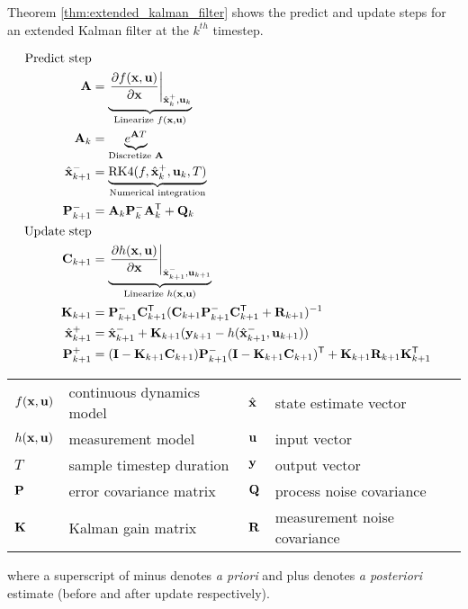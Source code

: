 Theorem \ref{thm:extended_kalman_filter} shows the predict and update steps for
an extended Kalman filter at the $k^{th}$ timestep.
\begin{theorem}
  \label{thm:extended_kalman_filter}
  \begin{align}
    \text{Predict step} \nonumber \\
    \mathbf{A} &=
      \underbrace{\left.\frac{\partial f(\mathbf{x}, \mathbf{u})}{\partial \mathbf{x}}
                  \right|_{\hat{\mathbf{x}}_k^+, \mathbf{u}_k}}
                 _{\text{Linearize } f(\mathbf{x}, \mathbf{u})} \\
    \mathbf{A}_k &= \underbrace{e^{\mathbf{A}T}}_{\text{Discretize } \mathbf{A}} \\
    \hat{\mathbf{x}}_{k+1}^- &=
      \underbrace{\text{RK4}(f, \hat{\mathbf{x}}_k^+, \mathbf{u}_k, T)}
                 _{\text{Numerical integration}} \\
    \mathbf{P}_{k+1}^- &= \mathbf{A}_k \mathbf{P}_k^- \mathbf{A}_k^\mathsf{T} + \mathbf{Q}_k \\
    \text{Update step} \nonumber \\
    \mathbf{C}_{k+1} &=
      \underbrace{\left.\frac{\partial h(\mathbf{x}, \mathbf{u})}{\partial \mathbf{x}}
                  \right|_{\hat{\mathbf{x}}_{k+1}^-, \mathbf{u}_{k+1}}}
                 _{\text{Linearize } h(\mathbf{x}, \mathbf{u})} \\
    \mathbf{K}_{k+1} &= \mathbf{P}_{k+1}^- \mathbf{C}_{k+1}^\mathsf{T}
      (\mathbf{C}_{k+1}\mathbf{P}_{k+1}^- \mathbf{C}_{k+1}^\mathsf{T} + \mathbf{R}_{k+1})^{-1} \\
    \hat{\mathbf{x}}_{k+1}^+ &=
      \hat{\mathbf{x}}_{k+1}^- + \mathbf{K}_{k+1}(\mathbf{y}_{k+1} -
      h(\hat{\mathbf{x}}_{k+1}^-, \mathbf{u}_{k+1})) \\
    \mathbf{P}_{k+1}^+ &= (\mathbf{I} - \mathbf{K}_{k+1}\mathbf{C}_{k+1})\mathbf{P}_{k+1}^-
      (\mathbf{I} - \mathbf{K}_{k+1}\mathbf{C}_{k+1})^\mathsf{T} +
      \mathbf{K}_{k+1}\mathbf{R}_{k+1}\mathbf{K}_{k+1}^\mathsf{T}
  \end{align}
  \begin{figurekey}
    \begin{tabular}{llll}
      $f(\mathbf{x}, \mathbf{u})$ & continuous dynamics model & $\hat{\mathbf{x}}$ & state estimate vector \\
      $h(\mathbf{x}, \mathbf{u})$ & measurement model & $\mathbf{u}$ & input vector \\
      $T$ & sample timestep duration & $\mathbf{y}$ & output vector \\
      $\mathbf{P}$ & error covariance matrix & $\mathbf{Q}$ & process noise covariance \\
      $\mathbf{K}$ & Kalman gain matrix & $\mathbf{R}$ & measurement noise covariance \\
    \end{tabular}
  \end{figurekey}

  where a superscript of minus denotes \textit{a priori} and plus denotes
  \textit{a posteriori} estimate (before and after update respectively).
\end{theorem}
